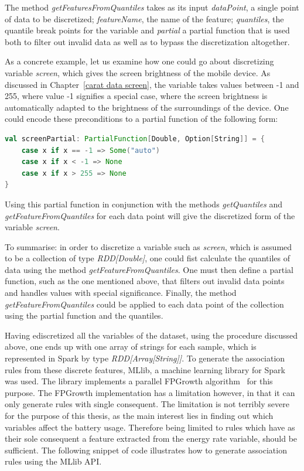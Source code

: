 The method \textit{getFeaturesFromQuantiles} takes as its input \textit{dataPoint}, a single point of data to be discretized; \textit{featureName}, the name of the feature; \textit{quantiles}, the quantile break points for the variable and \textit{partial} a partial function that is used both to filter out invalid data as well as to bypass the discretization altogether.

As a concrete example, let us examine how one could go about discretizing variable \textit{screen}, which gives the screen brightness of the mobile device. As discussed in Chapter~\ref{carat data screen}, the variable takes values between -1 and 255, where value -1 signifies a special case, where the screen brightness is automatically adapted to the brightness of the surroundings of the device. One could encode these preconditions to a partial function of the following form:
\begin{minipage}{\linewidth}
\begin{lstlisting}[language=scala] 
val screenPartial: PartialFunction[Double, Option[String]] = {
    case x if x == -1 => Some("auto")
    case x if x < -1 => None
	case x if x > 255 => None
}
\end{lstlisting}
\end{minipage} 
Using this partial function in conjunction with the methods \textit{getQuantiles} and \textit{getFeatureFromQuantiles} for each data point will give the discretized form of the variable \textit{screen}. 

To summarise: in order to discretize a variable such as \textit{screen}, which is assumed to be a collection of type \textit{RDD[Double]}, one could fist calculate the quantiles of data using the method \textit{getFeatureFromQuantiles}. One must then define a partial function, such as the one mentioned above, that filters out invalid data points and handles values with special significance. Finally, the method \textit{getFeatureFromQuantiles} could be applied to each data point of the collection using the partial function and the quantiles.

Having ediscretized all the variables of the dataset, using the procedure discussed above, one ends up with one array of strings for each sample, which is represented in Spark by type \textit{RDD[Array[String]]}. To generate the association rules from these discrete features, MLlib, a machine learning library for Spark was used. The library implements a parallel FPGrowth algorithm~\cite{Li:2008:PPF:1454008.1454027} for this purpose. The FPGrowth implementation has a limitation however, in that it can only generate rules with single consequent. The limitation is not terribly severe for the purpose of this thesis, as the main interest lies in finding out which variables affect the battery usage. Therefore being limited to rules which have as their sole consequent a feature extracted from the energy rate variable, should be sufficient. The following snippet of code illustrates how to generate association rules using the MLlib API.


